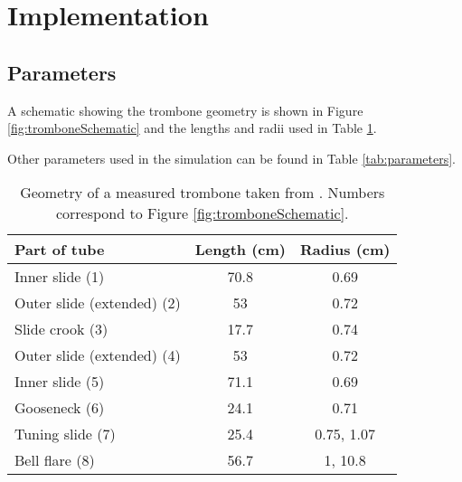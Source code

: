 \section{Implementation}

\subsection{Parameters}
A schematic showing the trombone geometry is shown in Figure \ref{fig:tromboneSchematic} and the lengths and radii used in Table \ref{tab:geometry}.

Other parameters used in the simulation can be found in Table \ref{tab:parameters}.


\begin{table}[t]
    \small
    \begin{center}
    \begin{tabular}{|l|c|c|}
        \hline
        Part of tube & Length (cm) & Radius (cm)\\\hline
        Inner slide (1) & 70.8 & 0.69\\
        Outer slide (extended) (2) & 53 & 0.72 
        \\
        Slide crook (3)& 17.7 & 0.74\\
        Outer slide (extended) (4) & 53 & 0.72 
        \\
        Inner slide (5) & 71.1 & 0.69\\
        Gooseneck (6) & 24.1 & 0.71\\
        Tuning slide (7) & 25.4 & 0.75, 1.07\\
        Bell flare (8) & 56.7 & 1, 10.8\\\hline
    \end{tabular}
    \caption{Geometry of a measured trombone taken from \cite{Smyth2011}. Numbers correspond to Figure \ref{fig:tromboneSchematic}.\label{tab:geometry}}
    \end{center}
\end{table}



